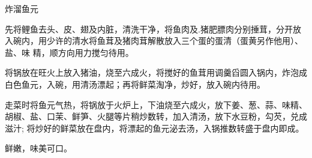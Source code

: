 \begin{recipe}{炸溜鱼元}

\ingredients


\preparation

\step 先将鲤鱼去头、皮、翅及内脏，清洗干净，将鱼肉及.猪肥膘肉分别捶茸，分开放
入碗内，用少许的清水将鱼茸及猪肉茸解散放入三个蛋的蛋清（蛋黄另作他用）、盐、味
精，顺方向用力搅匀待用。

\step 将锅放在旺火上放入猪油，烧至六成火，将搅好的鱼茸用调羹舀圆入锅内，炸泡成
白色鱼元，入碗，用清汤漂起；再将鲜菜淘净，炒好，放入碗内待用。

\step 走菜时将鱼元气热，将锅放于火炉上，下油烧至六成火，放下姜、葱、蒜、味精、
胡椒、盐、口茉、鲜笋、火腿等片稍炒数转，加入清汤，放下水豆粉，勾芡，兑成滋汁;
将炒好的鲜菜放在盘内，将漂起的鱼元泌去汤，入锅推数转盛于盘内即成。

\features

鲜嫩，味美可口。

\end{recipe}


